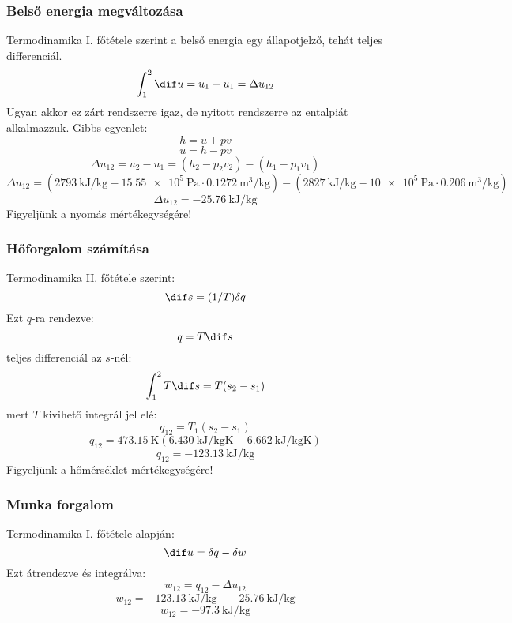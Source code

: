 		\subsubsection{Belső energia megváltozása}
			Termodinamika I. főtétele szerint a belső energia egy állapotjelző, tehát teljes differenciál.
			\[ \int_{1}^{2} \dif u = u_1 - u_1 = \Delta u_{12}
			\]  
			Ugyan akkor ez zárt rendszerre igaz, de nyitott rendszerre az entalpiát alkalmazzuk. Gibbs egyenlet:
			\[ h=u+pv\]  
			\[u=h-pv\] 
			\begin{equation}
				\Delta u_{12} = u_2 - u_1 = \left(h_2 -p_2  v_2\right) - \left(h_1 -p_1  v_1\right) 				 
			\end{equation}
			\begin{equation}
				\Delta u_{12} = \left( \SI{2793}{\kilo\joule\per\kilogram} - \SI{15,55e5}{\pascal} \cdot \SI{0,1272}{\meter\cubed\per\kilogram} \right) - \left( \SI{2827}{\kilo\joule\per\kilogram} - \SI{10e5}{\pascal} \cdot \SI{0,206}{\meter\cubed\per\kilogram} \right) 
			\end{equation}
			\begin{equation}
				\Delta u_{12} = \SI{-25,76}{\kilo\joule\per\kilogram} 
			\end{equation}
                                Figyeljünk a nyomás mértékegységére!
		\subsubsection{Hőforgalom számítása}
			Termodinamika II. főtétele szerint:
			\[ \dif s=(1/T)\delta q\] 
			Ezt $q$-ra rendezve:
			\[ q=T\dif s \]
			teljes differenciál az $s$-nél:
			\[ \int_{1}^{2} T\dif s= T(s_2-s_1) \]
			mert $T$ kivihető integrál jel elé:
			\begin{equation}
				q_{12} = T_1\left( s_2 - s_1\right) 
			\end{equation}   
			\begin{equation}
				q_{12} = \SI{473,15}{\kelvin} \left( \SI{6,430}{\kilo\joule\per\kilogram\kelvin} -\SI{6,662}{\kilo\joule\per\kilogram\kelvin}   \right) 
			\end{equation}
			\begin{equation}
				q_{12} = \SI{-123,13}{\kilo\joule\per\kilogram}
			\end{equation}	
                                 Figyeljünk a hőmérséklet mértékegységére!
		\subsubsection{Munka forgalom}
			Termodinamika I. főtétele alapján:
				\[ \dif u = \delta q - \delta w \]
			Ezt átrendezve és integrálva:					 
			\begin{equation}
				w_{12} = q_{12}- \Delta u_{12} 
			\end{equation}	
			\begin{equation}
				w_{12} = \SI{-123,13}{\kilo\joule\per\kilogram} - \SI{-25,76}{\kilo\joule\per\kilogram} 
			\end{equation}	
			\begin{equation}
				w_{12} = \SI{-97,3}{\kilo\joule\per\kilogram}
			\end{equation}
\pagebreak
